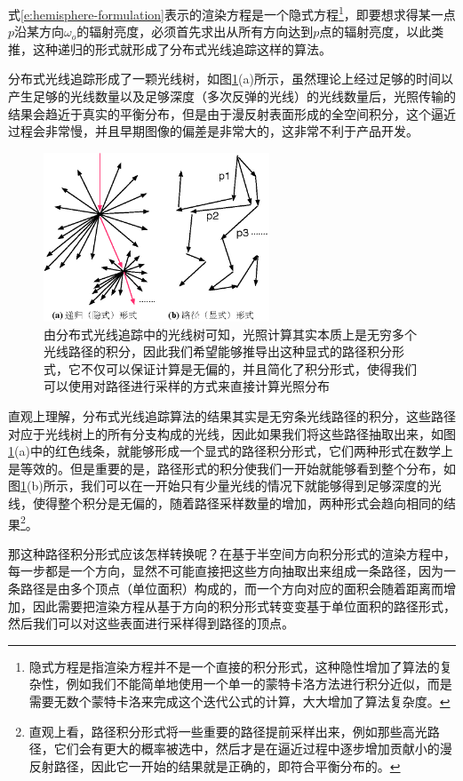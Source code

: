 式\ref{e:hemisphere-formulation}表示的渲染方程是一个隐式方程\footnote{隐式方程是指渲染方程并不是一个直接的积分形式，这种隐性增加了算法的复杂性，例如我们不能简单地使用一个单一的蒙特卡洛方法进行积分近似，而是需要无数个蒙特卡洛来完成这个迭代公式的计算，大大增加了算法复杂度。}，即要想求得某一点$p$沿某方向$\omega_o$的辐射亮度，必须首先求出从所有方向达到$p$点的辐射亮度，以此类推，这种递归的形式就形成了分布式光线追踪这样的算法。

分布式光线追踪形成了一颗光线树，如图\ref{f:pt-path}(a)所示，虽然理论上经过足够的时间以产生足够的光线数量以及足够深度（多次反弹的光线）的光线数量后，光照传输的结果会趋近于真实的平衡分布，但是由于漫反射表面形成的全空间积分，这个逼近过程会非常慢，并且早期图像的偏差是非常大的，这非常不利于产品开发。

\begin{figure}
	\sidecaption
	\includegraphics[width=0.6\textwidth]{figures/pt/path}
	\caption{由分布式光线追踪中的光线树可知，光照计算其实本质上是无穷多个光线路径的积分，因此我们希望能够推导出这种显式的路径积分形式，它不仅可以保证计算是无偏的，并且简化了积分形式，使得我们可以使用对路径进行采样的方式来直接计算光照分布}
	\label{f:pt-path}
\end{figure}

直观上理解，分布式光线追踪算法的结果其实是无穷条光线路径的积分，这些路径对应于光线树上的所有分支构成的光线，因此如果我们将这些路径抽取出来，如图\ref{f:pt-path}(a)中的红色线条，就能够形成一个显式的路径积分形式，它们两种形式在数学上是等效的。但是重要的是，路径形式的积分使我们一开始就能够看到整个分布，如图\ref{f:pt-path}(b)所示，我们可以在一开始只有少量光线的情况下就能够得到足够深度的光线，使得整个积分是无偏的，随着路径采样数量的增加，两种形式会趋向相同的结果\footnote{直观上看，路径积分形式将一些重要的路径提前采样出来，例如那些高光路径，它们会有更大的概率被选中，然后才是在逼近过程中逐步增加贡献小的漫反射路径，因此它一开始的结果就是正确的，即符合平衡分布的。}。

那这种路径积分形式应该怎样转换呢？在基于半空间方向积分形式的渲染方程中，每一步都是一个方向，显然不可能直接把这些方向抽取出来组成一条路径，因为一条路径是由多个顶点（单位面积）构成的，而一个方向对应的面积会随着距离而增加，因此需要把渲染方程从基于方向的积分形式转变变基于单位面积的路径形式，然后我们可以对这些表面进行采样得到路径的顶点。

